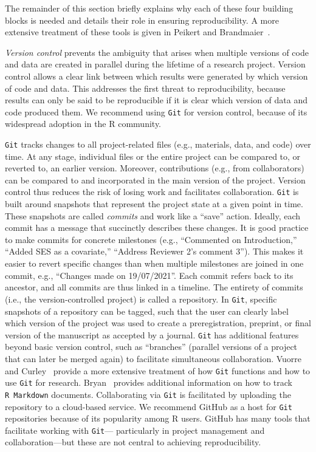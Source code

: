 \documentclass[psych,tutorial,accept,moreauthors,pdftex]{Definitions/mdpi}
\begin{document}
The remainder of this section briefly explains why each of these four
building blocks is needed and details their role in ensuring
reproducibility. A more extensive treatment of these tools is given in
Peikert and Brandmaier~\citep{Peikert2019}.

\emph{Version control} prevents the ambiguity that arises when multiple
versions of code and data are created in parallel during the lifetime of
a research project. Version control allows a clear link between which
results were generated by which version of code and data. This addresses
the first threat to reproducibility, because results can only be said to
be reproducible if it is clear which version of data and code produced
them. We recommend using \texttt{Git} for version control, because of
its widespread adoption in the R community.

\texttt{Git} tracks changes to all project-related files (e.g.,
materials, data, and code) over time. At any stage, individual files or
the entire project can be compared to, or reverted to, an earlier
version. Moreover, contributions (e.g., from collaborators) can be
compared to and incorporated in the main version of the project.
Version control thus reduces the risk of losing work and facilitates
collaboration. \texttt{Git} is built around snapshots that represent the
project state at a given point in time. These snapshots are called
\emph{commits} and work like a ``save'' action. Ideally, each commit has
a message that succinctly describes these changes. It is good practice
to make commits for concrete milestones (e.g., ``Commented on
Introduction,'' ``Added SES as a covariate,'' ``Address Reviewer 2's
comment 3''). This makes it easier to revert specific changes than when
multiple milestones are joined in one commit, e.g., ``Changes made on
19/07/2021''. Each commit refers back to its ancestor, and all commits
are thus linked in a timeline. The entirety of commits (i.e., the
version-controlled project) is called a repository. In \texttt{Git},
specific snapshots of a repository can be tagged, such that the user can
clearly label which version of the project was used to create a
preregistration, preprint, or final version of the manuscript as
accepted by a journal. \texttt{Git} has additional features beyond basic
version control, such as ``branches'' (parallel versions of a project
that can later be merged again) to facilitate simultaneous
collaboration. Vuorre and Curley~\citep{vuorreCuratingResearchAssets2018} provide a more
extensive treatment of how \texttt{Git} functions and how to use
\texttt{Git} for research. Bryan~\citep{bryanExcuseMeYou2018} provides
additional information on how to track \texttt{R\ Markdown} documents.
Collaborating via \texttt{Git} is facilitated by uploading the
repository to a cloud-based service. We recommend GitHub as a host for
\texttt{Git} repositories because of its popularity among R users.
GitHub has many tools that facilitate working with \texttt{Git}---
particularly in project management and collaboration---but these are not
central to achieving reproducibility.
\end{document}
